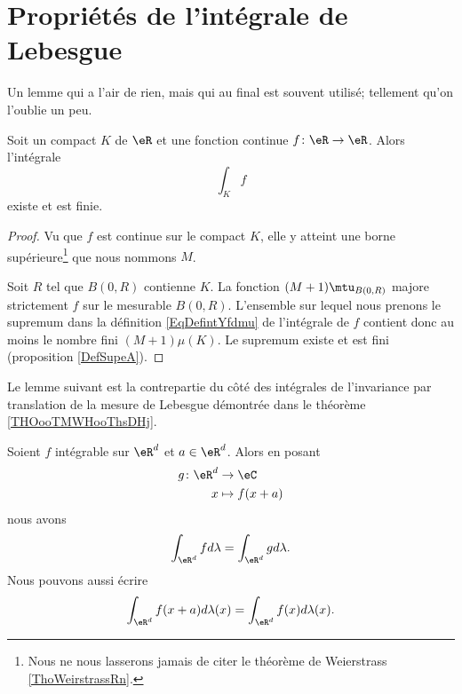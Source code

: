 
\section{Propriétés de l'intégrale de Lebesgue}

Un lemme qui a l'air de rien, mais qui au final est souvent utilisé; tellement qu'on l'oublie un peu.
\begin{lemma}       \label{LEMooWKSWooPptdEm}
    Soit un compact \( K\) de \( \eR\) et une fonction continue \( f\colon \eR\to \eR\). Alors l'intégrale
    \begin{equation}
        \int_Kf
    \end{equation}
    existe et est finie.
\end{lemma}

\begin{proof}
    Vu que \( f\) est continue sur le compact \( K\), elle y atteint une borne supérieure\footnote{Nous ne nous lasserons jamais de citer le théorème de Weierstrass \ref{ThoWeirstrassRn}.} que nous nommons \( M\).

    Soit \( R\) tel que \( B(0,R)\) contienne \( K\). La fonction \( (M+1)\mtu_{B(0,R)}\) majore strictement \( f\) sur le mesurable \( B(0,R)\). L'ensemble sur lequel nous prenons le supremum dans la définition \eqref{EqDefintYfdmu} de l'intégrale de \( f\) contient donc au moins le nombre fini \( (M+1)\mu(K)\). Le supremum existe et est fini (proposition \ref{DefSupeA}).
\end{proof}

Le lemme suivant est la contrepartie du côté des intégrales de l'invariance par translation de la mesure de Lebesgue démontrée dans le théorème \ref{THOooTMWHooThsDHj}.
\begin{lemma}       \label{LEMooGKOGooPLYaUO}
    Soient \( f\) intégrable sur \( \eR^d\) et \( a\in \eR^d\). Alors en posant
    \begin{equation}
        \begin{aligned}
            g\colon \eR^d&\to \eC \\
            x&\mapsto f(x+a) 
        \end{aligned}
    \end{equation}
    nous avons
    \begin{equation}
        \int_{\eR^d}fd\lambda = \int_{\eR^d}gd\lambda.
    \end{equation}
    Nous pouvons aussi écrire
    \begin{equation}
        \int_{\eR^d}f(x+a)d\lambda(x)=\int_{\eR^d}f(x)d\lambda(x).
    \end{equation}
\end{lemma}

